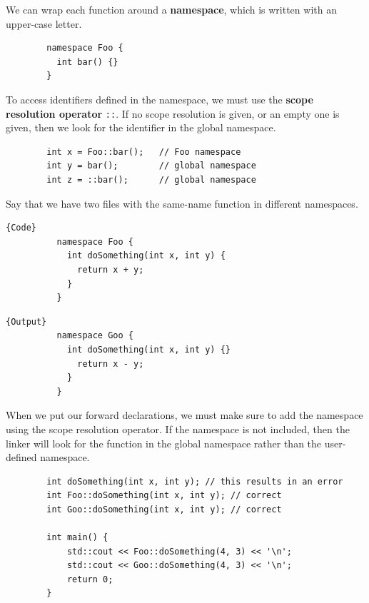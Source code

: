 \documentclass{article}
\newcounter{definition}[section]
\newcounter{example}[section]
\begin{document}
    \begin{definition}[Namespace]
      \label{def:namespace}
      We can wrap each function around a \textbf{namespace}, which is written with an upper-case letter. 
      \begin{lstlisting}
        namespace Foo {
          int bar() {}
        }
      \end{lstlisting}
      To access identifiers defined in the namespace, we must use the \textbf{scope resolution operator} \texttt{::}. If no scope resolution is given, or an empty one is given, then we look for the identifier in the global namespace. 
      \begin{lstlisting}
        int x = Foo::bar();   // Foo namespace
        int y = bar();        // global namespace
        int z = ::bar();      // global namespace 
      \end{lstlisting}
    \end{definition} 

    \begin{example}[Namespace]
      \label{ex:namespace}
      Say that we have two files with the same-name function in different namespaces. 
      
      \noindent\begin{minipage}{.5\textwidth}
        \begin{lstlisting}[]{Code}
          namespace Foo {
            int doSomething(int x, int y) {
              return x + y;
            }
          }
        \end{lstlisting}
        \end{minipage}
        \hfill
        \begin{minipage}{.49\textwidth}
        \begin{lstlisting}[]{Output}
          namespace Goo {
            int doSomething(int x, int y) {}
              return x - y;
            }
          }
        \end{lstlisting}
      \end{minipage}

      When we put our forward declarations, we must make sure to add the namespace using the scope resolution operator. If the namespace is not included, then the linker will look for the function in the global namespace rather than the user-defined namespace. 

      \begin{lstlisting}
        int doSomething(int x, int y); // this results in an error 
        int Foo::doSomething(int x, int y); // correct
        int Goo::doSomething(int x, int y); // correct

        int main() {
            std::cout << Foo::doSomething(4, 3) << '\n'; 
            std::cout << Goo::doSomething(4, 3) << '\n'; 
            return 0;
        }
      \end{lstlisting}
    \end{example} 
\end{document}

